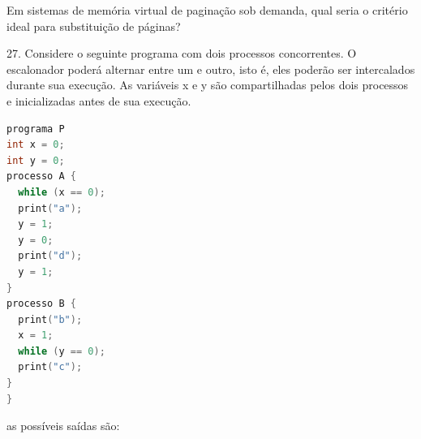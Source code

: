 \documentclass[10pt,a4paper]{article}
\begin{document}
{
\def\AMCbeginQuestion#1#2{\par\noindent{\bf (POSCOMP 2004 - Questão 26)}}
\begin{question}{} Em sistemas de memória virtual de paginação sob demanda, qual seria o critério ideal para substituição de páginas?
\begin{choices}
\end{choices}
\end{question}
}

{
\def\AMCbeginQuestion#1#2{\par\noindent{\bf (POSCOMP 2004 - Questão 27)}}
\begin{question}{} 27. Considere o seguinte programa com dois processos concorrentes. O escalonador poderá
alternar entre um e outro, isto é, eles poderão ser intercalados durante sua execução.
As variáveis x e y são compartilhadas pelos dois processos e inicializadas antes de sua
execução.
\begin{lstlisting}[language=C]
programa P
int x = 0;
int y = 0;
processo A {
  while (x == 0);
  print("a");
  y = 1;
  y = 0;
  print("d");
  y = 1;
}
processo B {
  print("b");
  x = 1;
  while (y == 0);
  print("c");
}
}
\end{lstlisting}
as possíveis saídas são:
\begin{choices}
\end{choices}
\end{question}
}
\end{document}
